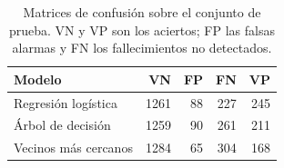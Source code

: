 \begin{table}[H]
\centering
\caption{Matrices de confusión sobre el conjunto de prueba. VN y VP son los aciertos; FP las falsas alarmas y FN los fallecimientos no detectados.}
\label{tab:confusion}
\small
\begin{tabular}{p{3.6cm} r r r r}
\toprule
\textbf{Modelo} & \textbf{VN} & \textbf{FP} & \textbf{FN} & \textbf{VP} \\
\midrule
Regresión logística & 1261 & 88 & 227 & 245 \\
Árbol de decisión & 1259 & 90 & 261 & 211 \\
Vecinos más cercanos & 1284 & 65 & 304 & 168 \\
\bottomrule
\end{tabular}
\end{table}

